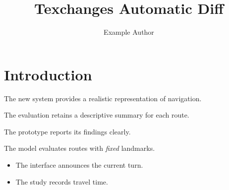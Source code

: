 \documentclass{article}
\title{Texchanges Automatic Diff}
\author{Example Author}
\date{}
\begin{document}
\maketitle

\section{Introduction}

The new system provides a realistic representation of navigation.

The evaluation retains a descriptive summary for each route.

The prototype reports its findings clearly.

The model evaluates routes with \emph{fixed} landmarks.

\begin{itemize}
  \item The interface announces the current turn.
  \item The study records travel time.
\end{itemize}
\end{document}
